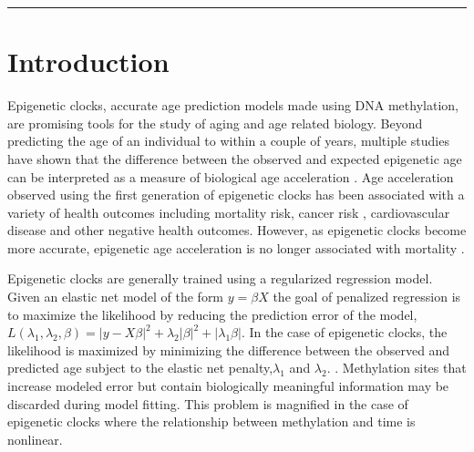 \documentclass{article}
\begin{document}
{\begin{linenumbers}
\begin{center}\rule{0.9\linewidth}{0.5pt}\end{center}
\section{Introduction}

Epigenetic clocks, accurate age prediction models made using DNA methylation, are promising tools for the 
study of aging and age related biology.  Beyond predicting the age of an individual to within a couple of 
years, multiple studies have shown that the difference between the observed and expected epigenetic age 
can be interpreted as a measure of biological age acceleration \cite{Horvath2018-ia}.  Age acceleration 
observed using the first generation of epigenetic clocks \cite{Horvath2013-sk,Hannum2013-um} has been 
associated with a variety of health outcomes including mortality risk\cite{Marioni2015-sn,Perna2016-pi}, 
cancer risk \cite{Dugue2018-ad}, cardiovascular disease\cite{Huang2019-hf} and other negative health 
outcomes\cite{Armstrong2017-vg,Horvath2015-wm,Horvath2014-nx}. However, as epigenetic clocks become more 
accurate, epigenetic age acceleration is no longer associated with mortality \cite{Zhang2019-br}. 
    
Epigenetic clocks are generally trained using a regularized regression model. Given an elastic net model of the 
form $y = \beta X$ the goal of penalized regression is to maximize the likelihood by reducing the prediction error 
of the model, $L(\lambda_1, \lambda_2, \beta) = |y -X\beta|^2+\lambda_2|\beta|^2+|\lambda_1\beta|$. In the case 
of epigenetic clocks, the likelihood is maximized by minimizing the difference between the observed and predicted 
age subject to the elastic net penalty,$\lambda_1$ and $\lambda_2$. . Methylation sites that increase modeled error 
but contain biologically meaningful information may be discarded during model fitting. This problem is magnified in 
the case of epigenetic clocks where the relationship between methylation and time is nonlinear\cite{Snir2019-ii}. 


\end{linenumbers}}
\end{document}
